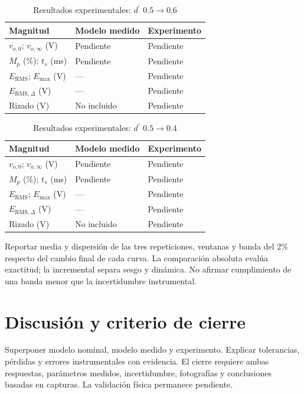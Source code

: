 \documentclass[conference,letterpaper]{IEEEtran}
\begin{document}
\begin{table}[H]\caption{Resultados experimentales: $d^{\prime}$ $0.5\to0.6$}\label{tab:lab-up}\centering\footnotesize\setlength{\tabcolsep}{2pt}\renewcommand{\arraystretch}{1.18}\begin{tabularx}{\columnwidth}{LYY}\toprule
Magnitud & Modelo medido & Experimento\\\midrule
$v_{o,0}$; $v_{o,\infty}$ (V) & Pendiente & Pendiente\\
$M_p$ (\%); $t_s$ (ms) & Pendiente & Pendiente\\
$E_{\mathrm{RMS}}$; $E_{\max}$ (V) & --- & Pendiente\\
$E_{\mathrm{RMS},\Delta}$ (V) & --- & Pendiente\\
Rizado (V) & No incluido & Pendiente\\\bottomrule\end{tabularx}\end{table}
\begin{table}[H]\caption{Resultados experimentales: $d^{\prime}$ $0.5\to0.4$}\label{tab:lab-down}\centering\footnotesize\setlength{\tabcolsep}{2pt}\renewcommand{\arraystretch}{1.18}\begin{tabularx}{\columnwidth}{LYY}\toprule
Magnitud & Modelo medido & Experimento\\\midrule
$v_{o,0}$; $v_{o,\infty}$ (V) & Pendiente & Pendiente\\
$M_p$ (\%); $t_s$ (ms) & Pendiente & Pendiente\\
$E_{\mathrm{RMS}}$; $E_{\max}$ (V) & --- & Pendiente\\
$E_{\mathrm{RMS},\Delta}$ (V) & --- & Pendiente\\
Rizado (V) & No incluido & Pendiente\\\bottomrule\end{tabularx}\end{table}
Reportar media y dispersión de las tres repeticiones, ventanas y banda del 2\% respecto del cambio final de cada curva. La comparación absoluta evalúa exactitud; la incremental separa sesgo y dinámica. No afirmar cumplimiento de una banda menor que la incertidumbre instrumental.

\section{Discusión y criterio de cierre}
Superponer modelo nominal, modelo medido y experimento. Explicar tolerancias, pérdidas y errores instrumentales con evidencia. El cierre requiere ambas respuestas, parámetros medidos, incertidumbre, fotografías y conclusiones basadas en capturas. La validación física permanece pendiente.
\end{document}
